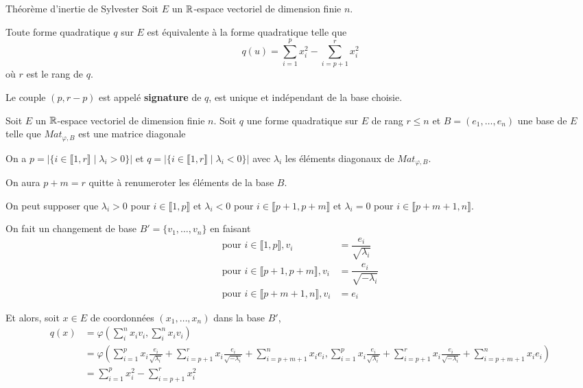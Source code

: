\documentclass[a4paper,12pt]{article}
\begin{document}
\clearpage

\begin{theoreme}{Théorème d'inertie de Sylvester}{}
    Soit $E$ un $\mathbb{R}$-espace vectoriel de dimension finie $n$.

    Toute forme quadratique $q$ sur $E$ est équivalente à la forme quadratique telle que
    $$
    q(u) = \sum_{i=1}^p x_i^2 - \sum_{i=p+1}^{r} x_i^2
    $$
    où $r$ est le rang de $q$.

    Le couple $(p, r - p)$ est appelé \textbf{signature} de $q$, est unique et indépendant de la base choisie.
\end{theoreme}

\begin{demonstration}
    Soit $E$ un $\mathbb{R}$-espace vectoriel de dimension finie $n$.
    Soit $q$ une forme quadratique sur $E$ de rang $r \leq n$ et $B = (e_1, \ldots, e_n)$ une base de $E$ telle que
    $Mat_{\varphi,B}$ est une matrice diagonale

    On a $p = |\{i \in \llbracket 1, r \rrbracket \mid \lambda_i > 0\}|$ et $q = |\{i \in \llbracket 1, r \rrbracket \mid \lambda_i < 0\}|$ avec
    $\lambda_i$ les éléments diagonaux de $Mat_{\varphi, B}$.

    On aura $p + m = r$ quitte à renumeroter les éléments de la base $B$.

    On peut supposer que $\lambda_i > 0$ pour $i \in \llbracket 1, p \rrbracket$ et $\lambda_i < 0$ pour $i \in \llbracket p + 1, p + m \rrbracket$ et $\lambda_i = 0$ pour $i \in \llbracket p + m + 1, n \rrbracket$.

    On fait un changement de base $B' = \{v_1, \ldots, v_n\}$ en faisant
    \begin{align*}
        \text{pour } i \in \llbracket 1, p \rrbracket, v_i &= \dfrac{e_i}{\sqrt{\lambda_i}} \\
        \text{pour } i \in \llbracket p + 1, p + m \rrbracket, v_i &= \dfrac{e_i}{\sqrt{-\lambda_i}} \\
        \text{pour } i \in \llbracket p + m + 1, n \rrbracket, v_i &= e_i
    \end{align*}

    Et alors, soit $x \in E$ de coordonnées $(x_1, \ldots, x_n)$ dans la base $B'$,
    \begin{align*}
        q(x) &= \varphi(\sum_i^n x_i v_i, \sum_i^n x_i v_i) \\
        &= \varphi\left(\sum_{i=1}^p x_i \frac{e_i}{\sqrt{\lambda_i}} + \sum_{i=p+1}^{r} x_i \frac{e_i}{\sqrt{-\lambda_i}} + \sum_{i=p+m+1}^n x_i e_i, \sum_{i=1}^p x_i \frac{e_i}{\sqrt{\lambda_i}} + \sum_{i=p+1}^{r} x_i \frac{e_i}{\sqrt{-\lambda_i}} + \sum_{i=p+m+1}^n x_i e_i\right) \\
        &= \sum_{i=1}^p x_i^2 - \sum_{i=p+1}^{r} x_i^2
    \end{align*}


\end{demonstration}
\end{document}
